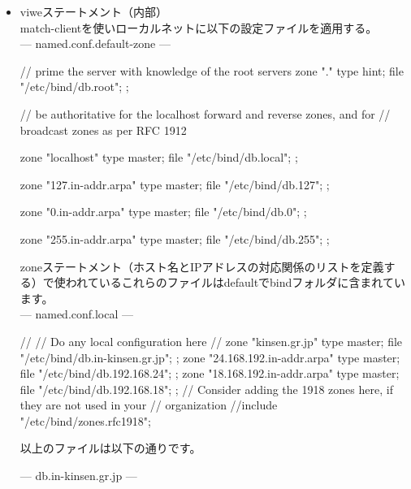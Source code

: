 \documentclass[mingoth,a4paper]{jsarticle}
\begin{document}
\begin{itemize}
\item viweステートメント（内部）\\
  match-clientを使いローカルネットに以下の設定ファイルを適用する。\\
--- named.conf.default-zone ---
\begin{commandline}
// prime the server with knowledge of the root servers
zone "." {
	type hint;
	file "/etc/bind/db.root";
};

// be authoritative for the localhost forward and reverse zones, and for
// broadcast zones as per RFC 1912

zone "localhost" {
	type master;
	file "/etc/bind/db.local";
};

zone "127.in-addr.arpa" {
	type master;
	file "/etc/bind/db.127";
};

zone "0.in-addr.arpa" {
	type master;
	file "/etc/bind/db.0";
};

zone "255.in-addr.arpa" {
	type master;
	file "/etc/bind/db.255";
};
\end{commandline}
zoneステートメント（ホスト名とIPアドレスの対応関係のリストを定義する）で使われているこれらのファイルはdefaultでbindフォルダに含まれています。\\
--- named.conf.local ---
\begin{commandline}
//
// Do any local configuration here
//
zone "kinsen.gr.jp" {
	type master;
	file "/etc/bind/db.in-kinsen.gr.jp";
};
zone "24.168.192.in-addr.arpa" {
	type master;
	file "/etc/bind/db.192.168.24";
};
zone "18.168.192.in-addr.arpa" {
	type master;
	file "/etc/bind/db.192.168.18";
};
// Consider adding the 1918 zones here, if they are not used in your
// organization
//include "/etc/bind/zones.rfc1918";
\end{commandline}
以上のファイルは以下の通りです。
\clearpage

--- db.in-kinsen.gr.jp ---
\end{itemize}
\end{document}
